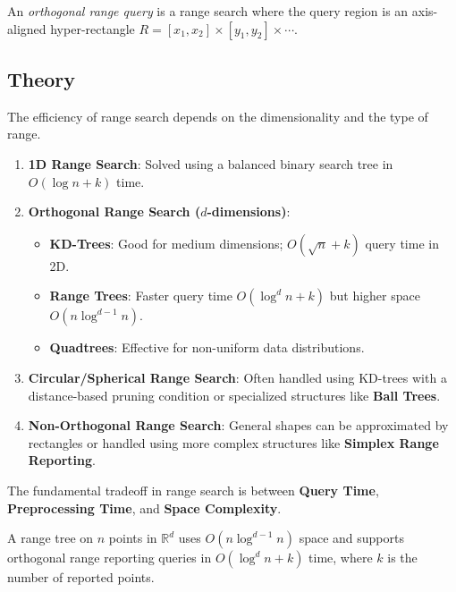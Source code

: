 \begin{definition}\label{def:orthogonal_range}
An \emph{orthogonal range query} is a range search where the query region is an axis-aligned hyper-rectangle $R = [x_1, x_2] \times [y_1, y_2] \times \cdots$.
\end{definition}

\subsection{Theory}

The efficiency of range search depends on the dimensionality and the type of range.
\begin{enumerate}
\item \textbf{1D Range Search}: Solved using a balanced binary search tree in $O(\log n + k)$ time.
\item \textbf{Orthogonal Range Search ($d$-dimensions)}:
  \begin{itemize}
  \item \textbf{KD-Trees}: Good for medium dimensions; $O(\sqrt{n} + k)$ query time in 2D.
  \item \textbf{Range Trees}: Faster query time $O(\log^d n + k)$ but higher space $O(n \log^{d-1} n)$.
  \item \textbf{Quadtrees}: Effective for non-uniform data distributions.
  \end{itemize}
\item \textbf{Circular/Spherical Range Search}: Often handled using KD-trees with a distance-based pruning condition or specialized structures like \textbf{Ball Trees}.
\item \textbf{Non-Orthogonal Range Search}: General shapes can be approximated by rectangles or handled using more complex structures like \textbf{Simplex Range Reporting}.
\end{enumerate}

The fundamental tradeoff in range search is between \textbf{Query Time}, \textbf{Preprocessing Time}, and \textbf{Space Complexity}.

\begin{theorem}\label{thm:range_tree}
A range tree on $n$ points in $\mathbb{R}^d$ uses $O(n \log^{d-1} n)$ space and supports orthogonal range reporting queries in $O(\log^d n + k)$ time, where $k$ is the number of reported points.
\end{theorem}

